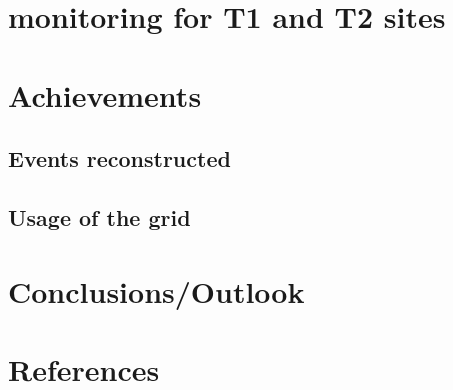 \documentclass[journal, transmag]{IEEEtran}
\begin{document}
\section{monitoring for T1 and T2 sites}
\section{Achievements}
\subsection{Events reconstructed}
\subsection{Usage of the grid}
\section{Conclusions/Outlook}
\section*{References}

\end{document}
